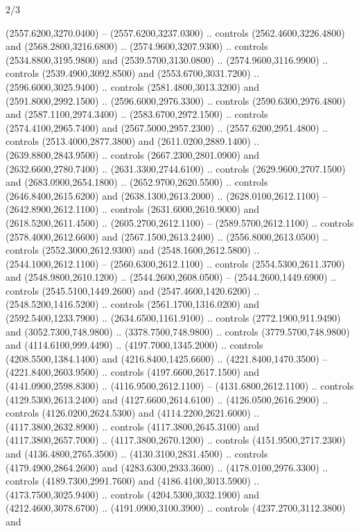 \begin{flagdescription}{2/3}
\begin{scope}[shift={(0.5\flaglength,0.5)},scale=\flagwidth/130]
\begin{scope}[y=0.01mm, x=0.01mm,shift={(-3365,-2250)}]
  (2557.6200,3270.0400) -- (2557.6200,3237.0300) .. controls
  (2562.4600,3226.4800) and (2568.2800,3216.6800) .. (2574.9600,3207.9300) ..
  controls (2534.8800,3195.9800) and (2539.5700,3130.0800) ..
  (2574.9600,3116.9900) .. controls (2539.4900,3092.8500) and
  (2553.6700,3031.7200) .. (2596.6000,3025.9400) .. controls
  (2581.4800,3013.3200) and (2591.8000,2992.1500) .. (2596.6000,2976.3300) ..
  controls (2590.6300,2976.4800) and (2587.1100,2974.3400) ..
  (2583.6700,2972.1500) .. controls (2574.4100,2965.7400) and
  (2567.5000,2957.2300) .. (2557.6200,2951.4800) .. controls
  (2513.4000,2877.3800) and (2611.0200,2889.1400) .. (2639.8800,2843.9500) ..
  controls (2667.2300,2801.0900) and (2632.6600,2780.7400) ..
  (2631.3300,2744.6100) .. controls (2629.9600,2707.1500) and
  (2683.0900,2654.1800) .. (2652.9700,2620.5500) .. controls
  (2646.8400,2615.6200) and (2638.1300,2613.2000) .. (2628.0100,2612.1100) --
  (2642.8900,2612.1100) .. controls (2631.6000,2610.9000) and
  (2618.5200,2611.4500) .. (2605.2700,2612.1100) -- (2589.5700,2612.1100) ..
  controls (2578.4000,2612.6600) and (2567.1500,2613.2400) ..
  (2556.8000,2613.0500) .. controls (2552.3000,2612.9300) and
  (2548.1600,2612.5800) .. (2544.1000,2612.1100) -- (2560.6300,2612.1100) ..
  controls (2554.5300,2611.3700) and (2548.9800,2610.1200) ..
  (2544.2600,2608.0500) -- (2544.2600,1449.6900) .. controls
  (2545.5100,1449.2600) and (2547.4600,1420.6200) .. (2548.5200,1416.5200) ..
  controls (2561.1700,1316.0200) and (2592.5400,1233.7900) ..
  (2634.6500,1161.9100) .. controls (2772.1900,911.9490) and
  (3052.7300,748.9800) .. (3378.7500,748.9800) .. controls (3779.5700,748.9800)
  and (4114.6100,999.4490) .. (4197.7000,1345.2000) .. controls
  (4208.5500,1384.1400) and (4216.8400,1425.6600) .. (4221.8400,1470.3500) --
  (4221.8400,2603.9500) .. controls (4197.6600,2617.1500) and
  (4141.0900,2598.8300) .. (4116.9500,2612.1100) -- (4131.6800,2612.1100) ..
  controls (4129.5300,2613.2400) and (4127.6600,2614.6100) ..
  (4126.0500,2616.2900) .. controls (4126.0200,2624.5300) and
  (4114.2200,2621.6000) .. (4117.3800,2632.8900) .. controls
  (4117.3800,2645.3100) and (4117.3800,2657.7000) .. (4117.3800,2670.1200) ..
  controls (4151.9500,2717.2300) and (4136.4800,2765.3500) ..
  (4130.3100,2831.4500) .. controls (4179.4900,2864.2600) and
  (4283.6300,2933.3600) .. (4178.0100,2976.3300) .. controls
  (4189.7300,2991.7600) and (4186.4100,3013.5900) .. (4173.7500,3025.9400) ..
  controls (4204.5300,3032.1900) and (4212.4600,3078.6700) ..
  (4191.0900,3100.3900) .. controls (4237.2700,3112.3800) and

\end{scope}
\end{scope}
\end{flagdescription}
